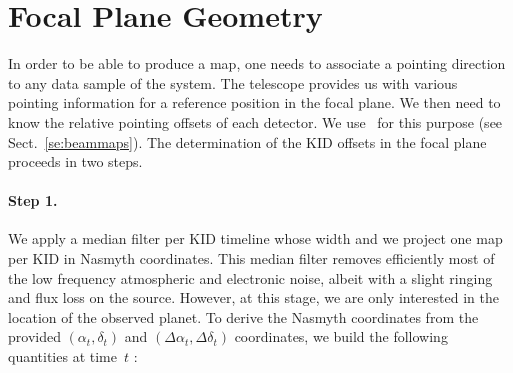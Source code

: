 %
%
%

\section{Focal Plane Geometry}%
\label{se:fov_geometry}



In order to be able to produce a map, one needs to associate a pointing
direction to any data sample of the system. The telescope provides us with
various pointing information for a reference position in the focal plane. We
then need to know the relative pointing offsets of each detector. We use
\bms\ for this purpose (see Sect.~\ref{se:beammaps}). The determination of the
KID offsets in the focal plane proceeds in two steps.

\paragraph{Step 1.} We apply a median filter per
KID timeline whose width  and we project one map per KID in Nasmyth
coordinates. This median filter removes
efficiently most of the low frequency atmospheric and electronic
noise, albeit with a slight ringing and flux loss on the
source. However, at this stage, we are only interested in the location
of the observed planet. To derive the Nasmyth coordinates from the
provided $(\alpha_t,\delta_t)$ and $(\Delta\alpha_t,\Delta\delta_t)$
coordinates, we build the following quantities at time~$t$ :

